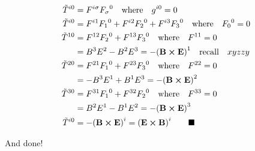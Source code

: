 \documentclass{article}
\begin{document}
\begin{align*}
  \tilde{T}^{i0} & =F^{i\sigma}{F_\sigma}^0\qq{where}g^{i0}=0                                  \\
  \tilde{T}^{i0} & =F^{i1}{F_1}^0+F^{i2}{F_2}^0+F^{i3}{F_3}^0\qq{where}{F_0}^0=0               \\
  \tilde{T}^{10} & =F^{12}{F_2}^0+F^{13}{F_3}^0\qq{where}F^{11}=0                              \\
                 & =B^3E^2-B^2E^3=-\pqty{\vb{B}\cross\vb{E}}^1\qq{recall}xyzzy                 \\
  \tilde{T}^{20} & =F^{21}{F_1}^0+F^{23}{F_3}^0\qq{where}F^{22}=0                              \\                  
                 & =-B^3E^1+B^1E^3=-\pqty{\vb{B}\cross\vb{E}}^2                                \\                  
  \tilde{T}^{30} & =F^{31}{F_1}^0+F^{32}{F_2}^0\qq{where}F^{33}=0                              \\                
                 & =B^2E^1-B^1E^2=-\pqty{\vb{B}\cross\vb{E}}^3                                 \\                
  \tilde{T}^{i0} & =-\pqty{\vb{B}\cross\vb{E}}^i=\pqty{\vb{E}\cross\vb{B}}^i\qquad\blacksquare \\
\end{align*}

And done!
\end{document}
